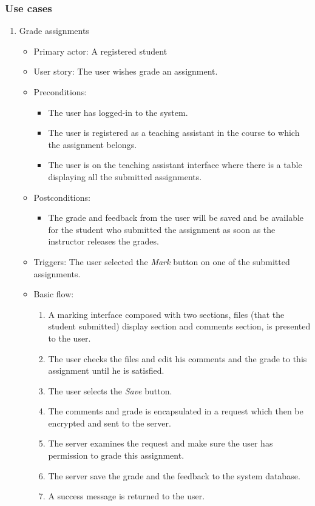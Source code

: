 \subsubsection{Use cases}
\begin{enumerate}
\item Grade assignments
\begin{itemize}
    \item Primary actor: A registered student
    \item User story: The user wishes grade an assignment.
    \item Preconditions:
        \begin{itemize}
            \item The user has logged-in to the system.
            \item The user is registered as a teaching assistant in the course
                to which the assignment belongs.
            \item The user is on the teaching assistant interface where there
                is a table displaying all the submitted assignments.
        \end{itemize}
    \item Postconditions:
        \begin{itemize}
            \item The grade and feedback from the user will be saved and be
                available for the student who submitted the assignment as soon
                as the instructor releases the grades.
        \end{itemize}
    \item Triggers:
        The user selected the \emph{Mark} button on one of the submitted
        assignments.
    \item Basic flow:
        \begin{enumerate}
            \item A marking interface composed with two sections, 
                files (that the student submitted) display section and
                comments section, is presented to the user.
            \item The user checks the files and edit his comments and the
                grade to this assignment until he is satisfied.
            \item The user selects the \emph{Save} button.
            \item The comments and grade is encapsulated in a request which
                then be encrypted and sent to the server.
            \item The server examines the request and make sure the user has
                permission to grade this assignment.
            \item The server save the grade and the feedback to the system
                database.
            \item A success message is returned to the user.
        \end{enumerate}
\end{itemize}
\end{enumerate}

